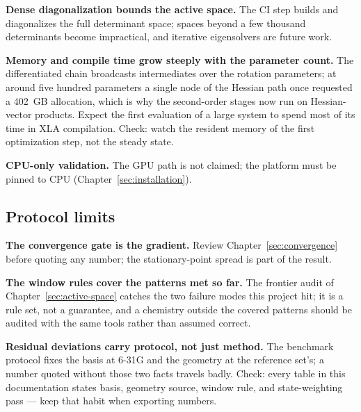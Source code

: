 \textbf{Dense diagonalization bounds the active space.}  The CI step
builds and diagonalizes the full determinant space; spaces beyond a
few thousand determinants become impractical, and iterative
eigensolvers are future work.

\textbf{Memory and compile time grow steeply with the parameter
count.}  The differentiated chain broadcasts intermediates over the
rotation parameters; at around five hundred parameters a single node
of the Hessian path once requested a 402~GB allocation, which is why
the second-order stages now run on Hessian-vector products.  Expect
the first evaluation of a large system to spend most of its time in
XLA compilation.  Check: watch the resident memory of the first
optimization step, not the steady state.

\textbf{CPU-only validation.}  The GPU path is not claimed; the
platform must be pinned to CPU (Chapter~\ref{sec:installation}).

\subsection{Protocol limits}

\textbf{The convergence gate is the gradient.}  Review
Chapter~\ref{sec:convergence} before quoting any number; the
stationary-point spread is part of the result.

\textbf{The window rules cover the patterns met so far.}  The frontier
audit of Chapter~\ref{sec:active-space} catches the two failure modes
this project hit; it is a rule set, not a guarantee, and a chemistry
outside the covered patterns should be audited with the same tools
rather than assumed correct.

\textbf{Residual deviations carry protocol, not just method.}  The
benchmark protocol fixes the basis at 6-31G and the geometry at the
reference set's; a number quoted without those two facts travels
badly.  Check: every table in this documentation states basis,
geometry source, window rule, and state-weighting pass --- keep that
habit when exporting numbers.
